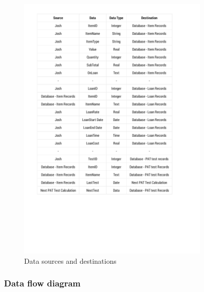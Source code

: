 \documentclass[a4paper,12pt]{report}
\begin{document}
\begin{figure}[H]
    \caption{Data sources and destinations} \label{fig: Data sources and destinations}
    \centerline{\includegraphics[page=1,width=350px]{./DataS&D/Data_S&D.pdf}}
\end{figure}

\subsubsection{Data flow diagram}
\end{document}
